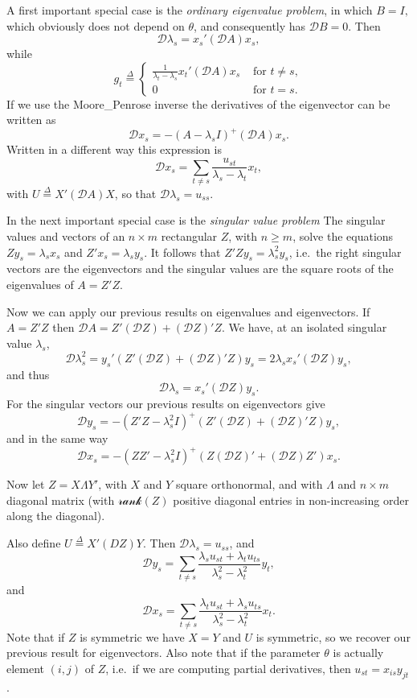 \documentclass[
  12pt,
]{book}
\begin{document}
A first important special case is the \emph{ordinary eigenvalue problem}, in which \(B=I,\) which obviously does not depend on \(\theta\), and consequently has \(\mathcal{D}B=0\).
Then
\[
\mathcal{D}\lambda_s=x_s'(\mathcal{D}A)x_s,
\]
while
\[
g_t\mathop{=}\limits^{\Delta}\begin{cases}\frac{1}{\lambda_t-\lambda_s}x_t'(\mathcal{D}A)x_s&\text{ for }t\not= s,\\
0&\text{ for }t=s.
\end{cases}
\]
If we use the Moore\_Penrose inverse the derivatives of the eigenvector can be written as
\[
\mathcal{D}x_s=-(A-\lambda_s I)^+(\mathcal{D}A)x_s.
\]
Written in a different way this expression is
\[
\mathcal{D}x_s=\sum_{t\not =s}\frac{u_{st}}{\lambda_s-\lambda_t}x_t,
\]
with \(U\mathop{=}\limits^{\Delta}X'(\mathcal{D}A)X\), so that \(\mathcal{D}\lambda_s=u_{ss}\).

In the next important special case is the \emph{singular value problem} The singular values and vectors of an \(n\times m\) rectangular \(Z\), with \(n\geq m\), solve the equations \(Zy_s=\lambda_s x_s\) and \(Z'x_s=\lambda_s y_s\). It follows that \(Z'Zy_s=\lambda_s^2y_s\), i.e.~the right singular vectors are the eigenvectors and the singular values are the square roots of the eigenvalues of \(A=Z'Z\).

Now we can apply our previous results on eigenvalues and eigenvectors. If \(A=Z'Z\) then \(\mathcal{D}A=Z'(\mathcal{D}Z)+(\mathcal{D}Z)'Z\). We
have, at an isolated singular value \(\lambda_s\),
\[
\mathcal{D}\lambda_s^2=y_s'(Z'(\mathcal{D}Z)+(\mathcal{D}Z)'Z)y_s=2\lambda_s x_s'(\mathcal{D}Z)y_s,
\]
and thus
\[
\mathcal{D}\lambda_s=x_s'(\mathcal{D}Z)y_s.
\]
For the singular vectors our previous results on eigenvectors give
\[
\mathcal{D}y_s=-(Z'Z-\lambda_s^2 I)^+(Z'(\mathcal{D}Z)+(\mathcal{D}Z)'Z)y_s,
\]
and in the same way
\[
\mathcal{D}x_s=-(ZZ'-\lambda_s^2 I)^+(Z(\mathcal{D}Z)'+(\mathcal{D}Z)Z')x_s.
\]

Now let \(Z=X\Lambda Y'\), with \(X\) and \(Y\) square orthonormal, and with \(\Lambda\) and \(n\times m\) diagonal matrix (with \(\mathcal{rank}(Z)\) positive diagonal entries in non-increasing order along the diagonal).

Also define \(U\mathop{=}\limits^{\Delta}X'(DZ)Y\). Then \(\mathcal{D}\lambda_s=u_{ss}\), and
\[
\mathcal{D}y_s
=\sum_{t\not= s}\frac{\lambda_su_{st}+\lambda_t u_{ts}}{\lambda_s^2-\lambda_t^2} y_t,
\]
and
\[
\mathcal{D}x_s
=\sum_{t\not= s}\frac{\lambda_t u_{st}+\lambda_su_{ts}}{\lambda_s^2-\lambda_t^2} x_t.
\]
Note that if \(Z\) is symmetric we have \(X=Y\) and \(U\) is symmetric, so we recover our previous result for eigenvectors.
Also note that if the parameter \(\theta\) is actually
element \((i,j)\) of \(Z\), i.e.~if we are computing partial derivatives, then \(u_{st}=x_{is}y_{jt}\).
\end{document}
